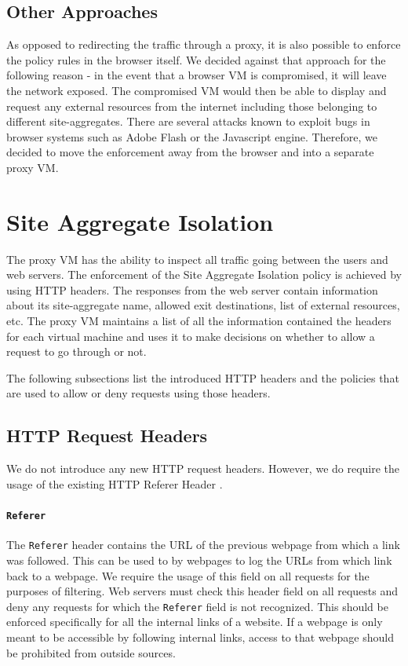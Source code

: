 \subsection{Other Approaches}

As opposed to redirecting the traffic through a proxy, it is also possible to enforce the policy rules in the browser itself. We decided against that approach for the following reason - in the event that a browser VM is compromised, it will leave the network exposed. The compromised VM would then be able to display and request any external resources from the internet including those belonging to different site-aggregates. There are several attacks known to exploit bugs in browser systems such as Adobe Flash or the Javascript engine. Therefore, we decided to move the enforcement away from the browser and into a separate proxy VM.

\section{Site Aggregate Isolation}

The proxy VM has the ability to inspect all traffic going between the users and web servers. The enforcement of the Site Aggregate Isolation policy is achieved by using HTTP headers. The responses from the web server contain information about its site-aggregate name, allowed exit destinations, list of external resources, etc. The proxy VM maintains a list of all the information contained the headers for each virtual machine and uses it to make decisions on whether to allow a request to go through or not.

The following subsections list the introduced HTTP headers and the policies that are used to allow or deny requests using those headers.

\subsection{HTTP Request Headers}

We do not introduce any new HTTP request headers. However, we do require the usage of the existing HTTP Referer Header \cite{rfc-referrer} \cite{mozdev-referrer}.

\paragraph{\texttt{Referer}} The {\tt Referer} header contains the URL of the previous webpage from which a link was followed. This can be used to by webpages to log the URLs from which link back to a webpage. We require the usage of this field on all requests for the purposes of filtering. Web servers must check this header field on all requests and deny any requests for which the {\tt Referer} field is not recognized. This should be enforced specifically for all the internal links of a website. If a webpage is only meant to be accessible by following internal links, access to that webpage should be prohibited from outside sources.

